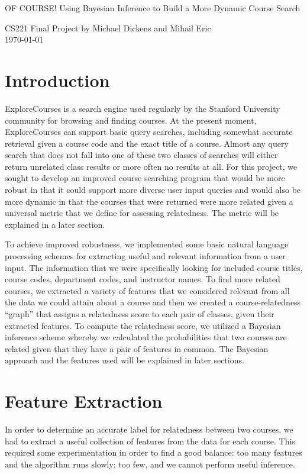 \documentclass[12pt]{article}
\begin{document}
\begin{center}
{\Large OF COURSE! Using Bayesian Inference to Build a More Dynamic
  Course Search}

{\normalsize CS221 Final Project by Michael Dickens and Mihail Eric}\\
\today 
\end{center}


\section*{Introduction}
ExploreCourses is a search engine used regularly by the Stanford
University community for browsing and finding courses. At the present
moment, ExploreCourses can support basic query searches, including
somewhat accurate retrieval given a course code and the exact title of
a course. Almost any query search that does not fall into one of these
two classes of searches will either return unrelated class results or
more often no results at all. For this project, we sought to develop
an improved course searching program that would be more robust in that
it could support more diverse user input queries and would also be
more dynamic in that the courses that were returned were more related
given a universal metric that we define for assessing relatedness. The
metric will be explained in a later section.

To achieve improved robustness, we implemented some basic natural
language processing schemes for extracting useful and relevant
information from a user input. The information that we were
specifically looking for included course titles, course codes,
department codes, and instructor names. To find more related courses,
we extracted a variety of features that we considered relevant from
all the data we could attain about a course and then we created a
course-relatedness ``graph'' that assigns a relatedness score to each
pair of classes, given their extracted features. To compute the
relatedness score, we utilized a Bayesian inference scheme whereby we
calculated the probabilities that two courses are related given that
they have a pair of features in common. The Bayesian approach and the
features used will be explained in later sections.

\section*{Feature Extraction}
In order to determine an accurate label for relatedness
between two courses, we had to extract a useful collection of
features from the data for each course. This required some
experimentation in order to find a good balance: too many features and
the algorithm runs slowly; too few, and we cannot perform useful
inference.
\end{document}
